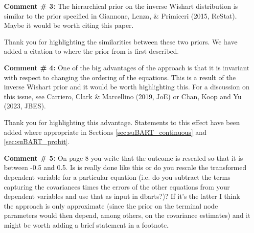 \documentclass{article}
\begin{document}
\begin{mdframed}
    \textbf{Comment \# 3:} The hierarchical prior on the inverse Wishart distribution is similar to the prior specified in Giannone, Lenza, \& Primiceri (2015, ReStat). Maybe it would be worth citing this paper.
\end{mdframed}

Thank you for highlighting the similarities between these two priors. We have added a citation to \citet{giannone2015prior} where the prior from \citet{huang2013simple} is first described.

\begin{mdframed}
    \textbf{Comment \# 4:} One of the big advantages of the approach is that it is invariant with respect to changing the ordering of the equations. This is a result of the inverse Wishart prior and it would be worth highlighting this. For a discussion on this issue, see Carriero, Clark \& Marcellino (2019, JoE) or Chan, Koop and Yu (2023, JBES).
\end{mdframed}

Thank you for highlighting this advantage. Statements to this effect have been added where appropriate in Sections \ref{sec:suBART_continuous} and \ref{sec:suBART_probit}.

\begin{mdframed}
    \textbf{Comment \# 5:} On page 8 you write that the outcome is rescaled so that it is between -0.5 and 0.5. Is is really done like this or do you rescale the transformed dependent variable for a particular equation (i.e. do you subtract the terms capturing the covariances times the errors of the other equations from your dependent variables and use that as input in dbarts?)? If it's the latter I think the approach is only approximate (since the prior on the terminal node parameters would then depend, among others, on the covariance estimates) and it might be worth adding a brief statement in a footnote.
\end{mdframed}
\end{document}
